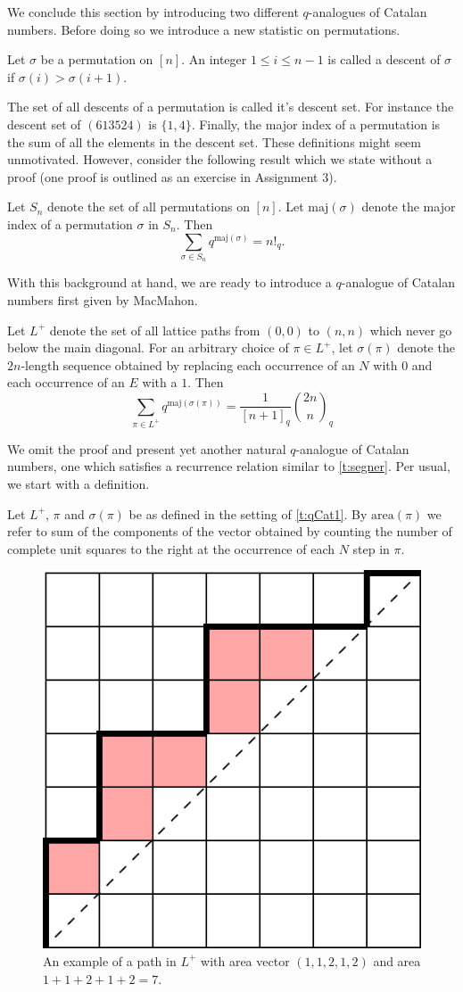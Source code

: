 We conclude this section by introducing two different $q$-analogues of Catalan numbers. Before doing so we introduce a new statistic on permutations. 
\begin{definition}
Let $\sigma$ be a permutation on $[n]$. An integer $1\leq i\leq n-1$ is called a descent of $\sigma$ if $\sigma(i)>\sigma(i+1)$. 
\end{definition}
The set of all descents of a permutation is called it's descent set. For instance the descent set of $(613524)$ is $\{1,4\}$. Finally, the major index of a permutation is the sum of all the elements in the descent set. These definitions might seem unmotivated. However, consider the following result which we state without a proof (one proof is outlined as an exercise in Assignment 3). 
\begin{theorem}
Let $S_n$ denote the set of all permutations on $[n]$. Let $\text{maj}(\sigma)$ denote the major index of a permutation $\sigma$ in $S_n$. Then
\[
    \sum_{\sigma\in S_n} q^{\text{maj}(\sigma)} = n!_q.
\]
\end{theorem}
With this background at hand, we are ready to introduce a $q$-analogue of Catalan numbers first given by MacMahon.
\begin{theorem}
Let $L^+$ denote the set of all lattice paths from $(0,0)$ to $(n,n)$ which never go below the main diagonal. For an arbitrary choice of $\pi\in L^+$, let $\sigma(\pi)$ denote the $2n$-length sequence obtained by replacing each occurrence of an $N$ with $0$ and each occurrence of an $E$ with a $1$. Then 
    \[
    \sum_{\pi\in L^+} q^{\text{maj}(\sigma(\pi))} = \dfrac{1}{[n+1]_q}\binom{2n}{n}_q
    \]
\label{t:qCat1}
\end{theorem}
We omit the proof and present yet another natural $q$-analogue of Catalan numbers, one which satisfies a recurrence relation similar to \cref{t:segner}. Per usual, we start with a definition.
\begin{definition}
    Let $L^+$, $\pi$ and $\sigma(\pi)$ be as defined in the setting of \cref{t:qCat1}. By $\text{area}(\pi)$ we refer to sum of the components of the vector obtained by counting the number of complete unit squares to the right at the occurrence of each $N$ step in $\pi$.
\end{definition}
\begin{figure}[H]
    \centering
    \includegraphics[width=0.5\linewidth]{Images/Figure31.png}
    \caption{An example of a path in $L^+$ with area vector $(1,1,2,1,2)$ and area $1+1+2+1+2=7$.}
    \label{fig:enter-label}
\end{figure}

